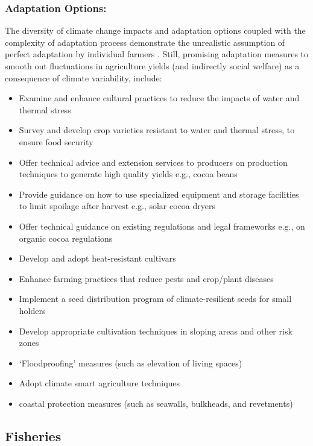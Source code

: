 \documentclass[
]{book}
\providecommand{\tightlist}{%
  \setlength{\itemsep}{0pt}\setlength{\parskip}{0pt}}
\begin{document}
\hypertarget{adaptation-options-10}{%
\subsubsection{Adaptation Options:}\label{adaptation-options-10}}

The diversity of climate change impacts and adaptation options coupled with the complexity of adaptation process demonstrate the unrealistic assumption of perfect adaptation by individual farmers . Still, promising adaptation measures to smooth out fluctuations in agriculture yields (and indirectly social welfare) as a consequence of climate variability, include:

\begin{itemize}
\tightlist
\item
  Examine and enhance cultural practices to reduce the impacts of water and thermal stress
\item
  Survey and develop crop varieties resistant to water and thermal stress, to ensure food security
\item
  Offer technical advice and extension services to producers on production techniques to generate high quality yields e.g., cocoa beans
\item
  Provide guidance on how to use specialized equipment and storage facilities to limit spoilage after harvest e.g., solar cocoa dryers
\item
  Offer technical guidance on existing regulations and legal frameworks e.g., on organic cocoa regulations
\item
  Develop and adopt heat-resistant cultivars
\item
  Enhance farming practices that reduce pests and crop/plant diseases
\item
  Implement a seed distribution program of climate-resilient seeds for small holders
\item
  Develop appropriate cultivation techniques in sloping areas and other risk zones
\item
  `Floodproofing' measures (such as elevation of living spaces)
\item
  Adopt climate smart agriculture techniques
\item
  coastal protection measures (such as seawalls, bulkheads, and revetments)
\end{itemize}

\hypertarget{fisheries-1}{%
\subsection{Fisheries}\label{fisheries-1}}
\end{document}
